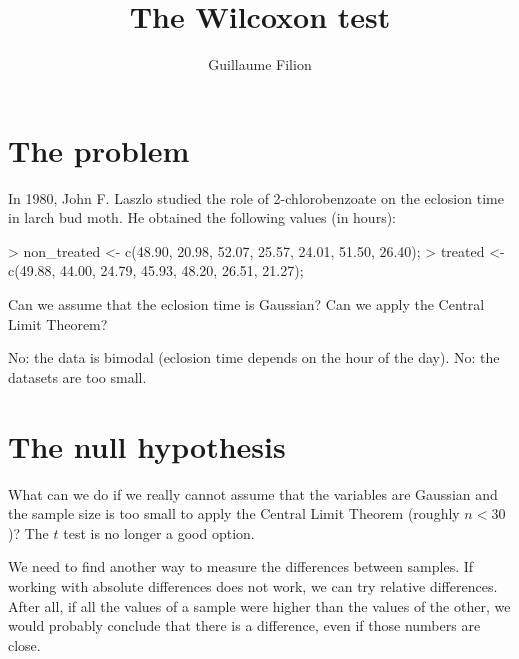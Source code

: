 \documentclass[a4paper]{article}
\title{The Wilcoxon test}
\author{Guillaume Filion}
\theoremstyle{definition}
\begin{document}
\maketitle


\section{The problem}

In 1980, John F. Laszlo studied the role of 2-chlorobenzoate on the
eclosion time in larch bud moth. He obtained the following values (in
hours):

\begin{Schunk}
\begin{Sinput}
> non_treated <- c(48.90, 20.98, 52.07, 25.57, 24.01, 51.50, 26.40);
> treated <- c(49.88, 44.00, 24.79, 45.93, 48.20, 26.51, 21.27);
\end{Sinput}
\end{Schunk}

\begin{Exercise}
Can we assume that the eclosion time is Gaussian? Can we apply the
Central Limit Theorem?
\end{Exercise}
\begin{Answer}
No: the data is bimodal (eclosion time depends on the hour of the
day). No: the datasets are too small.
\end{Answer}


\section{The null hypothesis}

What can we do if we really cannot assume that the variables are Gaussian
and the sample size is too small to apply the Central Limit Theorem
(roughly $n < 30$)? The $t$ test is no longer a good option.

We need to find another way to measure the differences between samples.
If working with absolute differences does not work, we can try relative
differences. After all, if all the values of a sample were higher than the
values of the other, we would probably conclude that there is a difference,
even if those numbers are close.
\end{document}
